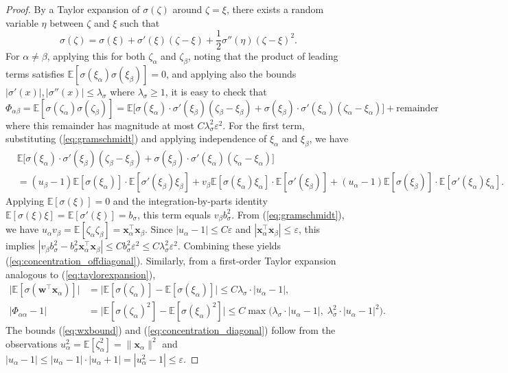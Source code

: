 \documentclass{article}
\theoremstyle{definition}
\newcommand{\E}{\mathbb{E}}
\newcommand{\x}{\mathbf{x}}
\newcommand{\w}{\mathbf{w}}
\renewcommand{\a}{\alpha}
\renewcommand{\b}{\beta}
\newcommand{\eps}{\varepsilon}
\newcommand{\1}{\mathbf{1}}
\begin{document}
\begin{proof}
By a Taylor expansion of $\sigma(\zeta)$ around $\zeta=\xi$,
there exists a random variable $\eta$ between $\zeta$ and $\xi$ such that
\begin{equation}\label{eq:taylorexpansion}
\sigma(\zeta)=\sigma(\xi)+\sigma'(\xi)(\zeta-\xi)+\frac{1}{2}\sigma''(\eta)(\zeta-\xi)^2.
\end{equation}
For $\a \neq \b$,
applying this for both $\zeta_\a$ and $\zeta_\b$, noting that the product of
leading terms satisfies $\E[\sigma(\xi_\a)\sigma(\xi_\b)]=0$, and applying
also the bounds $|\sigma'(x)|,|\sigma''(x)| \leq \lambda_\sigma$ where
$\lambda_\sigma \geq 1$, it is easy to check that
\[\Phi_{\a\b}=\E[\sigma(\zeta_\a)\sigma(\zeta_\b)]
=\E\Big[\sigma(\xi_\a) \cdot
\sigma'(\xi_\b)(\zeta_\b-\xi_\b)+\sigma(\xi_\b) \cdot
\sigma'(\xi_\a)(\zeta_\a-\xi_\a) \Big]+\text{remainder}\]
where this remainder has magnitude at most $C\lambda_\sigma^2\eps^2$.
For the first term, substituting (\ref{eq:gramschmidt}) and applying
independence of $\xi_\a$ and $\xi_\b$, we have
\begin{align*}
&\E\Big[\sigma(\xi_\a) \cdot
\sigma'(\xi_\b)(\zeta_\b-\xi_\b)+\sigma(\xi_\b) \cdot
\sigma'(\xi_\a)(\zeta_\a-\xi_\a) \Big]\\
&=(u_\b-1) \E[\sigma(\xi_\a)] \cdot \E[\sigma'(\xi_\b)\xi_\b]
+v_\b \E[\sigma(\xi_\a)\xi_\a] \cdot \E[\sigma'(\xi_\b)]
+(u_\a-1) \E[\sigma(\xi_\b)] \cdot \E[\sigma'(\xi_\a)\xi_\a].
\end{align*}
Applying $\E[\sigma(\xi)]=0$ and the integration-by-parts identity
$\E[\sigma(\xi)\xi]=\E[\sigma'(\xi)]=b_\sigma$, this term equals $v_\b
b_\sigma^2$. From (\ref{eq:gramschmidt}), we have $u_\a v_\b=\E[\zeta_\a
\zeta_\b]=\x_\a^\top \x_\b$. Since $|u_\a-1| \leq C\eps$ and $|\x_\a^\top \x_\b|
\leq \eps$, this implies $|v_\b b_\sigma^2-b_\sigma^2 \x_\a^\top \x_\b| \leq
Cb_\sigma^2 \eps^2 \leq C\lambda_\sigma^2 \eps^2$.
Combining these yields (\ref{eq:concentration_offdiagonal}). Similarly,
from a first-order Taylor expansion analogous to
(\ref{eq:taylorexpansion}),
\begin{align*}
\Big|\E[\sigma(\w^\top \x_\a)]\Big|
&=\Big|\E[\sigma(\zeta_\a)]-\E[\sigma(\xi_\a)]\Big|
\leq C\lambda_\sigma \cdot |u_\a-1|,\\
|\Phi_{\a\a}-1|&=\Big|\E[\sigma(\zeta_\a)^2]-\E[\sigma(\xi_\a)^2]\Big|
\leq C\max\Big(\lambda_\sigma \cdot |u_\a-1|,\;\lambda_\sigma^2 \cdot
|u_\a-1|^2\Big).
\end{align*}
The bounds (\ref{eq:wxbound}) and
(\ref{eq:concentration_diagonal}) follow from the observations
$u_\a^2=\E[\zeta_\a^2]=\|\x_\a\|^2$ and
$|u_\a-1| \leq |u_\a-1| \cdot |u_\a+1|=|u_\a^2-1| \leq \eps$.


\end{proof}
\end{document}
